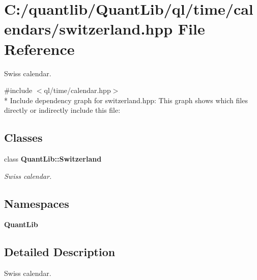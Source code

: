 \section{C\+:/quantlib/\+Quant\+Lib/ql/time/calendars/switzerland.hpp File Reference}
\label{switzerland_8hpp}


Swiss calendar.  


{\ttfamily \#include $<$ql/time/calendar.\+hpp$>$}\\*
Include dependency graph for switzerland.\+hpp\+:
This graph shows which files directly or indirectly include this file\+:
\subsection*{Classes}
\begin{DoxyCompactItemize}
\item 
class {\bf Quant\+Lib\+::\+Switzerland}
\begin{DoxyCompactList}\small\item\em Swiss calendar. \end{DoxyCompactList}\end{DoxyCompactItemize}
\subsection*{Namespaces}
\begin{DoxyCompactItemize}
\item 
 {\bf Quant\+Lib}
\end{DoxyCompactItemize}


\subsection{Detailed Description}
Swiss calendar. 

